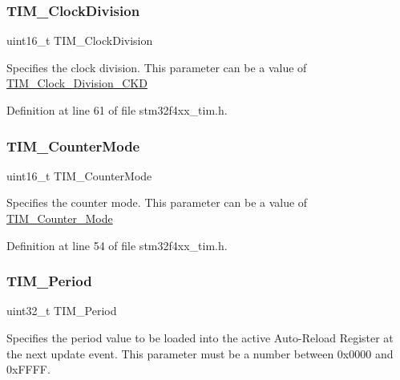 \subsubsection{\texorpdfstring{T\+I\+M\+\_\+\+Clock\+Division}{TIM\_ClockDivision}}
{\footnotesize\ttfamily uint16\+\_\+t T\+I\+M\+\_\+\+Clock\+Division}

Specifies the clock division. This parameter can be a value of \hyperlink{group___t_i_m___clock___division___c_k_d}{T\+I\+M\+\_\+\+Clock\+\_\+\+Division\+\_\+\+C\+KD} 

Definition at line 61 of file stm32f4xx\+\_\+tim.\+h.

\mbox{\label{struct_t_i_m___time_base_init_type_def_adfc97c66bfce30e74ce779ab04c156e9}} 
\subsubsection{\texorpdfstring{T\+I\+M\+\_\+\+Counter\+Mode}{TIM\_CounterMode}}
{\footnotesize\ttfamily uint16\+\_\+t T\+I\+M\+\_\+\+Counter\+Mode}

Specifies the counter mode. This parameter can be a value of \hyperlink{group___t_i_m___counter___mode}{T\+I\+M\+\_\+\+Counter\+\_\+\+Mode} 

Definition at line 54 of file stm32f4xx\+\_\+tim.\+h.

\mbox{\label{struct_t_i_m___time_base_init_type_def_a642ee05352126af48248167939742034}} 
\subsubsection{\texorpdfstring{T\+I\+M\+\_\+\+Period}{TIM\_Period}}
{\footnotesize\ttfamily uint32\+\_\+t T\+I\+M\+\_\+\+Period}

Specifies the period value to be loaded into the active Auto-\/\+Reload Register at the next update event. This parameter must be a number between 0x0000 and 0x\+F\+F\+FF. 

